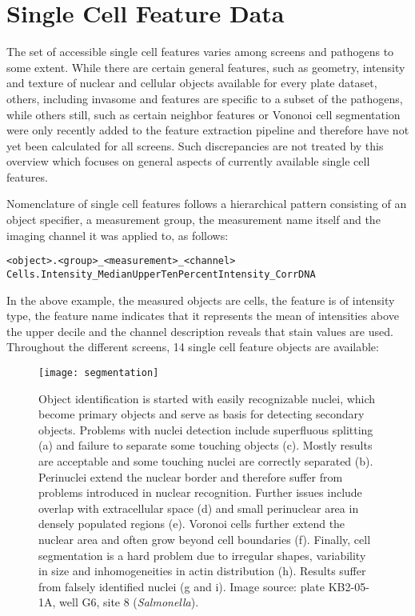 \section{Single Cell Feature Data}
\label{sec:scf-data}
The set of accessible single cell features varies among screens and pathogens to some extent. While there are certain general features, such as geometry, intensity and texture of nuclear and cellular objects available for every plate dataset, others, including invasome and  features are specific to a subset of the pathogens, while others still, such as certain neighbor features or Vononoi cell segmentation were only recently added to the feature extraction pipeline and therefore have not yet been calculated for all screens. Such discrepancies are not treated by this overview which focuses on general aspects of currently available single cell features.

Nomenclature of single cell features follows a hierarchical pattern consisting of an object specifier, a measurement group, the measurement name itself and the imaging channel it was applied to, as follows:
\begin{center}
\texttt{<object>.<group>\_<measurement>\_<channel>}
\texttt{Cells.Intensity\_MedianUpperTenPercentIntensity\_CorrDNA}
\end{center}
In the above example, the measured objects are cells, the feature is of intensity type, the feature name indicates that it represents the mean of intensities above the upper decile and the channel description reveals that  stain values are used. Throughout the different screens, 14 single cell feature objects are available:

\begin{figure}
  \centering
  \texttt{[image: segmentation]}
  \caption[Object detection of nuclei, perinuclei, Voronoi cells and cell bodies along with potential pitfalls.]{Object identification is started with easily recognizable nuclei, which become primary objects and serve as basis for detecting secondary objects. Problems with nuclei detection include superfluous splitting (a) and failure to separate some touching objects (c). Mostly results are acceptable and some touching nuclei are correctly separated (b). Perinuclei extend the nuclear border and therefore suffer from problems introduced in nuclear recognition. Further issues include overlap with extracellular space (d) and small perinuclear area in densely populated regions (e). Voronoi cells further extend the nuclear area and often grow beyond cell boundaries (f). Finally, cell segmentation is a hard problem due to irregular shapes, variability in size and inhomogeneities in actin distribution (h). Results suffer from falsely identified nuclei (g and i). Image source: plate KB2-05-1A, well G6, site 8 (\textit{Salmonella}).}
  \label{fig:segmentation}
\end{figure}

